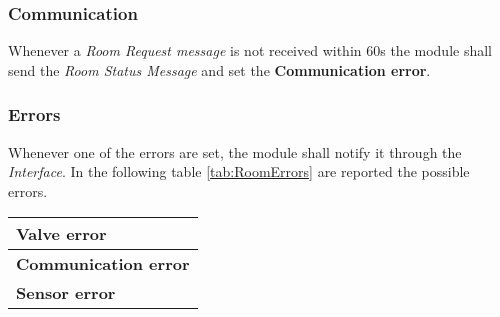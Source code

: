 \subsubsection{Communication}
Whenever a \textit{Room Request message} is not received within 60s the module shall send the \textit{Room Status Message} and set the \textbf{Communication error}.

\subsubsection{Errors}
Whenever one of the errors are set, the module shall notify it through the \textit{Interface}.
In the following table \ref{tab:RoomErrors} are reported the possible errors.
\begin{center}
	\begin{tabular}{|| l ||} 
		\hline
		\textbf{Valve error} \\ 
		\hline
		\textbf{Communication error} \\ 
		\hline
		\textbf{Sensor error} \\ 
		\hline
	\end{tabular}
\end{center}
